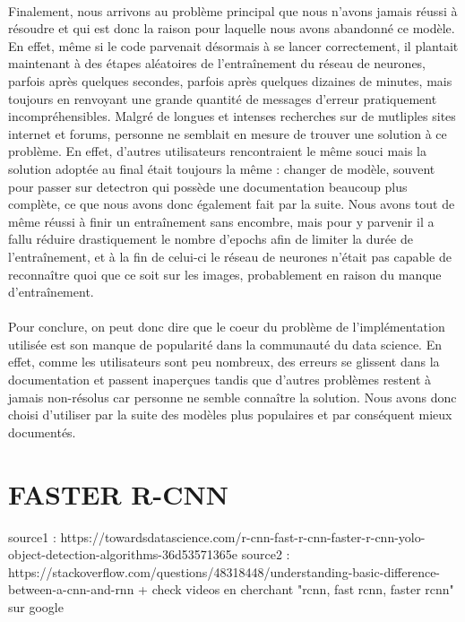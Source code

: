 \paragraph{} Finalement, nous arrivons au problème principal que nous n'avons jamais réussi à résoudre et qui est donc la raison pour laquelle nous avons abandonné ce modèle. En effet, même si le code parvenait désormais à se lancer correctement, il plantait maintenant à des étapes aléatoires de l'entraînement du réseau de neurones, parfois après quelques secondes, parfois après quelques dizaines de minutes, mais toujours en renvoyant une grande quantité de messages d'erreur pratiquement incompréhensibles. Malgré de longues et intenses recherches sur de mutliples sites internet et forums, personne ne semblait en mesure de trouver une solution à ce problème. En effet, d'autres utilisateurs rencontraient le même souci mais la solution adoptée au final était toujours la même : changer de modèle, souvent pour passer sur detectron qui possède une documentation beaucoup plus complète, ce que nous avons donc également fait par la suite. Nous avons tout de même réussi à finir un entraînement sans encombre, mais pour y parvenir il a fallu réduire drastiquement le nombre d'epochs afin de limiter la durée de l'entraînement, et à la fin de celui-ci le réseau de neurones n'était pas capable de reconnaître quoi que ce soit sur les images, probablement en raison du manque d'entraînement.

\paragraph{} Pour conclure, on peut donc dire que le coeur du problème de l'implémentation utilisée est son manque de popularité dans la communauté du data science. En effet, comme les utilisateurs sont peu nombreux, des erreurs se glissent dans la documentation et passent inaperçues tandis que d'autres problèmes restent à jamais non-résolus car personne ne semble connaître la solution. Nous avons donc choisi d'utiliser par la suite des modèles plus populaires et par conséquent mieux documentés. 

\section{FASTER R-CNN}

source1 : https://towardsdatascience.com/r-cnn-fast-r-cnn-faster-r-cnn-yolo-object-detection-algorithms-36d53571365e \newline\newline
source2 : https://stackoverflow.com/questions/48318448/understanding-basic-difference-between-a-cnn-and-rnn \newline\newline
+ check videos en cherchant "rcnn, fast rcnn, faster rcnn" sur google






